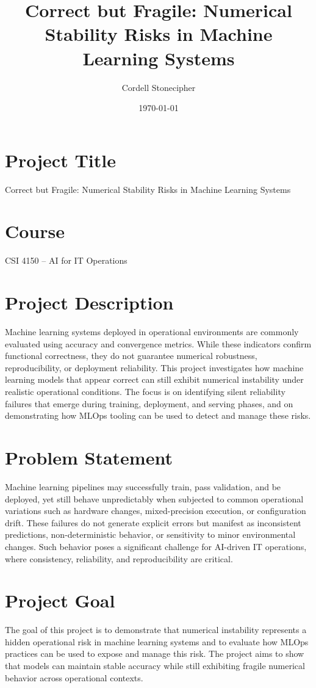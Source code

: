 \documentclass[11pt]{article}
\title{\textbf{Correct but Fragile: Numerical Stability Risks in Machine Learning Systems}}
\author{Cordell Stonecipher}
\date{\today}
\begin{document}
\maketitle

\onehalfspacing

\section*{Project Title}
Correct but Fragile: Numerical Stability Risks in Machine Learning Systems

\section*{Course}
CSI 4150 -- AI for IT Operations

\section*{Project Description}
Machine learning systems deployed in operational environments are commonly evaluated using accuracy and convergence metrics. While these indicators confirm functional correctness, they do not guarantee numerical robustness, reproducibility, or deployment reliability. This project investigates how machine learning models that appear correct can still exhibit numerical instability under realistic operational conditions. The focus is on identifying silent reliability failures that emerge during training, deployment, and serving phases, and on demonstrating how MLOps tooling can be used to detect and manage these risks.

\section*{Problem Statement}
Machine learning pipelines may successfully train, pass validation, and be deployed, yet still behave unpredictably when subjected to common operational variations such as hardware changes, mixed-precision execution, or configuration drift. These failures do not generate explicit errors but manifest as inconsistent predictions, non-deterministic behavior, or sensitivity to minor environmental changes. Such behavior poses a significant challenge for AI-driven IT operations, where consistency, reliability, and reproducibility are critical.

\section*{Project Goal}
The goal of this project is to demonstrate that numerical instability represents a hidden operational risk in machine learning systems and to evaluate how MLOps practices can be used to expose and manage this risk. The project aims to show that models can maintain stable accuracy while still exhibiting fragile numerical behavior across operational contexts.
\end{document}
